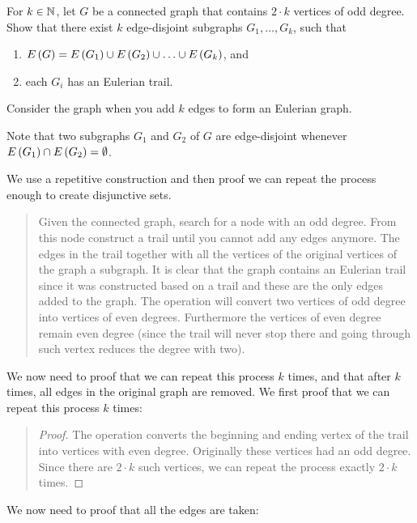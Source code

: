 \documentclass{article}
\begin{document}
\begin{exercise}
For $k\in\mathbb{N}$, let $G$ be a connected graph that contains $2\cdot k$ vertices of odd degree. Show that there exist $k$ edge-disjoint subgraphs $G_1,\ldots,G_k$, such that
\begin{enumerate}
 \item $E\left( G \right)=E\left( G_1 \right)\cup E\left( G_2 \right)\cup\ldots\cup E\left( G_k \right)$, and
 \item each $G_i$ has an Eulerian trail.
\end{enumerate}
\begin{hint}
Consider the graph when you add $k$ edges to form an Eulerian graph.
\end{hint}
\begin{note}
Note that two subgraphs $G_1$ and $G_2$ of $G$ are edge-disjoint whenever $E\left( G_1 \right)\cap E\left( G_2 \right)=\emptyset$.
\begin{answer}
We use a repetitive construction and then proof we can repeat the process enough to create disjunctive sets.
\begin{quote}\begin{construction}
Given the connected graph, search for a node with an odd degree. From this node construct a trail until you cannot add any edges anymore. The edges in the trail together with all the vertices of the original vertices of the graph a subgraph. It is clear that the graph contains an Eulerian trail since it was constructed based on a trail and these are the only edges added to the graph. The operation will convert two vertices of odd degree into vertices of even degrees. Furthermore the vertices of even degree remain even degree (since the trail will never stop there and going through such vertex reduces the degree with two).
\end{construction}\end{quote}
We now need to proof that we can repeat this process $k$ times, and that after $k$ times, all edges in the original graph are removed. We first proof that we can repeat this process $k$ times:
\begin{quote}\begin{proof}
The operation converts the beginning and ending vertex of the trail into vertices with even degree. Originally these vertices had an odd degree. Since there are $2\cdot k$ such vertices, we can repeat the process exactly $2\cdot k$ times.
\end{proof}\end{quote}
We now need to proof that all the edges are taken:

\end{answer}
\end{note}
\end{exercise}
\end{document}
